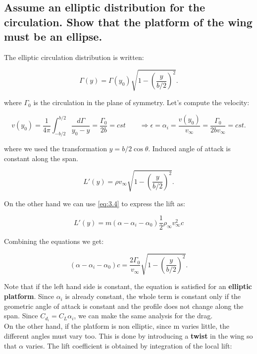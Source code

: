 \documentclass[british,french,11pt, a4paper, openany]{article}
\begin{document}
\subsection{Assume an elliptic distribution for the circulation. Show that the platform of the
	wing must be an ellipse.}

The elliptic circulation distribution is written:

\begin{equation}
\Gamma (y) = \Gamma (y_0) \sqrt{1-\left( \frac{y}{b/2} \right)^2}.
\end{equation}

where $\Gamma _0$ is the circulation in the plane of symmetry. Let's compute the velocity:

\begin{equation}
v(y_0) = \frac{1}{4\pi} \int _{-b/2}^{b/2} \frac{d\Gamma }{y_0 - y} = \frac{\Gamma _0}{2b} = cst \qquad \Rightarrow \epsilon = \alpha _i = \frac{v(y_0)}{v_\infty} = \frac{\Gamma _0}{2b v_\infty} = cst.
\end{equation}

where we used the transformation $y = b/2 \cos \theta$. Induced angle of attack is constant along the span.

\begin{equation}
L'(y) = \rho v_\infty \sqrt{1-\left( \frac{y}{b/2} \right)^2}.
\end{equation}

On the other hand we can use \eqref{eq:3.4} to express the lift as: 

\begin{equation}
L'(y) = m (\alpha - \alpha _i - \alpha _0) \frac{1}{2} \rho _\infty v_\infty ^2 c
\end{equation}

Combining the equations we get: 

\begin{equation}
(\alpha - \alpha _i - \alpha _0) c = \frac{2\Gamma _0}{v_\infty} \sqrt{1-\left( \frac{y}{b/2}\right)^2}. 
\end{equation}

Note that if the left hand side is constant, the equation is satisfied for an \textbf{elliptic platform}. Since $\alpha _i$ is already constant, the whole term is constant only if the geometric angle of attack is constant and the profile does not change along the span. Since $C_{d_i} = C_L \alpha _i$, we can make the same analysis for the drag. \\

On the other hand, if the platform is non elliptic, since m varies little, the different angles must vary too. This is done by introducing a \textbf{twist} in the wing so that $\alpha$ varies. The lift coefficient is obtained by integration of the local lift:
\end{document}
